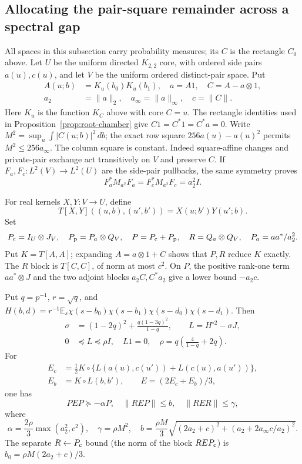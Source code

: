 \subsection{Allocating the pair-square remainder across a spectral gap}
\label{imp:env:gap-section}

All spaces in this subsection carry probability measures; its $C$ is the rectangle $C_0$ above.  Let $U$ be
the uniform directed $K_{2,2}$ core, with ordered side pairs $a(u),c(u)$,
and let $V$ be the uniform ordered distinct-pair space.  Put
\begin{align*}
 A(u;b)&=K_u(b_0)K_u(b_1),\quad a=A1,\quad C=A-a\otimes1,\\
 a_2&=\|a\|_2,\quad a_\infty=\|a\|_\infty,\quad c=\|C\|.
\end{align*}
Here $K_u$ is the function $K_C$ above with core $C=u$.
The rectangle identities used in
Proposition~\ref{prop:root-chamber} give
$C1=C^*1=C^*a=0$.  Write $M^2=\sup_u\int|C(u;b)|^2\,db$;
the exact row square $256a(u)-a(u)^2$ permits $M^2\le256a_\infty$.
The column square is constant.  Indeed square-affine changes and
private-pair exchange act transitively on $V$ and preserve $C$.
If $F_a,F_c:L^2(V)\to L^2(U)$ are the side-pair pullbacks, the same
symmetry proves
\begin{equation}\label{imp:env:conditional-square}
 F_a^*M_{a^2}F_a=F_c^*M_{a^2}F_c=a_2^2I.
\end{equation}

For real kernels $X,Y:V\to U$, define
\[
 T[X,Y]((u,b),(u',b'))=X(u;b')Y(u';b).
\]
Set
\[
 P_{\rm c}=I_U\otimes J_V,\quad P_{\rm p}=P_a\otimes Q_V,\quad
 P=P_{\rm c}+P_{\rm p},\quad R=Q_a\otimes Q_V,\quad P_a=aa^*/a_2^2.
\]
Put $K=T[A,A]$; expanding $A=a\otimes1+C$ shows that $P,R$ reduce $K$ exactly.
The $R$ block is $T[C,C]$, of norm at most $c^2$.
On $P$, the positive rank-one term $aa^*\otimes J$ and the two adjoint
blocks $a_2C,C^*a_2$ give a lower bound $-a_2c$.

\begin{lemma}
\label{imp:env:pair-residual}
Put $q=p^{-1}$, $r=\sqrt q$, and
$H(b,d)=r^{-1}\mathbb E_s\chi(s-b_0)\chi(s-b_1)
\chi(s-d_0)\chi(s-d_1)$.  Then
\begin{align*}
 \sigma&=(1-2q)^2+\frac{q(1-3q)^2}{1-q},\qquad
 L=H^{\circ2}-\sigma J,\\
 0&\preceq L\preceq\rho I,\quad L1=0,
 \quad\rho=q\left(\frac4{1-q}+2q\right).
\end{align*}
For
\begin{align*}
 E_c&=\tfrac12K\circ\{L(a(u),c(u'))+L(c(u),a(u'))\},\\
 E_b&=K\circ L(b,b'),\qquad E=(2E_c+E_b)/3,
\end{align*}
one has
\[
 PEP\succeq-\alpha P,\quad\|REP\|\le b,\quad
 \|RER\|\le\gamma,
\]
where
\[
 \alpha=\frac{2\rho}{3}\max(a_2^2,c^2),\quad
 \gamma=\rho M^2,\quad
 b=\frac{\rho M}{3}
 \sqrt{(2a_2+c)^2+(a_2+2a_\infty c/a_2)^2}.
\]
The separate $R\leftarrow P_{\rm c}$ bound (the norm of the block $REP_{\rm c}$) is
$b_0=\rho M(2a_2+c)/3$.
\end{lemma}

